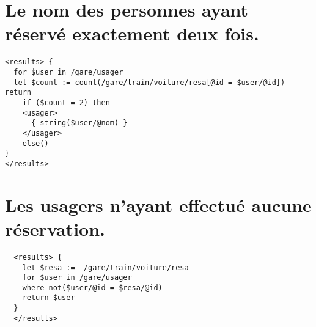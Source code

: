 \section{Le nom des personnes ayant réservé exactement deux fois.}
\begin{verbatim}
<results> {
  for $user in /gare/usager
  let $count := count(/gare/train/voiture/resa[@id = $user/@id]) return
    if ($count = 2) then
    <usager>
      { string($user/@nom) }
    </usager>
    else()
}
</results>
\end{verbatim}

\section{Les usagers n’ayant effectué aucune réservation.}
\begin{verbatim}
  <results> {
    let $resa :=  /gare/train/voiture/resa
    for $user in /gare/usager
    where not($user/@id = $resa/@id)
    return $user
  }
  </results>
\end{verbatim}

